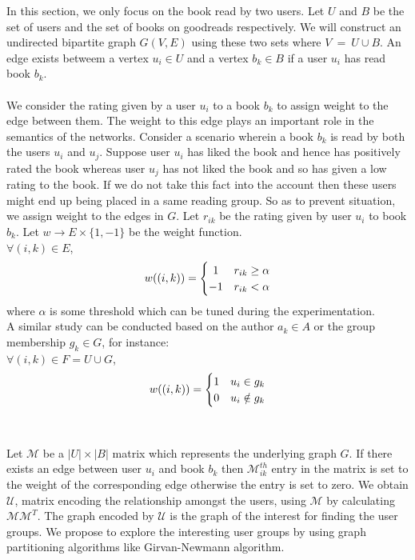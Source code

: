 \documentclass[12pt]{article}
\begin{document}
In this section, we only focus on the book read by two users. Let $U$ and $B$ be the set of users and the set of books on goodreads respectively. We will construct an undirected bipartite graph $G(V, E)$ using these two sets where $V ~=~ U \cup B$. An edge exists betweem a vertex $u_i \in U$ and a vertex $b_k \in B$ if a user $u_i$ has read book $b_k$.\\\\
We consider the rating given by a user $u_i$ to a book $b_k$ to assign weight to the edge between them. The weight to this edge plays an important role in the semantics of the networks. Consider a scenario wherein a book $b_k$ is read by both the users $u_i$ and $u_j$. Suppose user $u_i$ has liked the book and hence has positively rated the book whereas user $u_j$ has not liked the book and so has given a low rating to the book. If we do not take this fact into the account then these users might end up being placed in a same reading group. So as to prevent situation, we assign weight to the edges in $G$. Let $r_{ik}$ be the rating given by user $u_i$ to book $b_k$. Let $w \rightarrow E \times \{1, -1\}$ be the weight function.\\
$\forall (i, k) \in E$, 
\[
	w((i, k)) = \left\{\def\arraystretch{1.2}%
		\begin{array}{@{}c@{\quad}l@{}}
		1 & r_{ik} \geq \alpha\\
		-1 & r_{ik} < \alpha\\
		\end{array}\right.
\]
where $\alpha$ is some threshold which can be tuned during the experimentation.\\
A similar study can be conducted based on the author $a_k \in A$ or the group membership $g_k \in G$, for instance:\\
$\forall (i, k) \in F=U \cup G$, 
\[
	w((i, k)) = \left\{\def\arraystretch{1.2}%
		\begin{array}{@{}c@{\quad}l@{}}
		1 & u_i \in g_k\\
		0 & u_i \notin g_k\\
		\end{array}\right.
\]
\\\\

Let $\mathcal{M}$ be a $|U| \times |B|$ matrix which represents the underlying graph $G$. If there exists an edge between user $u_i$ and book $b_k$ then $\mathcal{M}_{ik}^{th}$ entry in the matrix is set to the weight of the corresponding edge otherwise the entry is set to zero. We obtain $\mathcal{U}$, matrix encoding the relationship amongst the users, using $\mathcal{M}$ by calculating $\mathcal{M}\mathcal{M}^{T}$. The graph encoded by $\mathcal{U}$ is the graph of the interest for finding the user groups. We propose to explore the interesting user groups by using graph partitioning algorithms like Girvan-Newmann algorithm.
\end{document}
